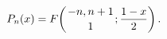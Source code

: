 \[\mathop{P_{n}\/}\nolimits\!\left(x\right)=\mathop{F\/}\nolimits\!\left({-n,n+1%
\atop 1};\frac{1-x}{2}\right).\]